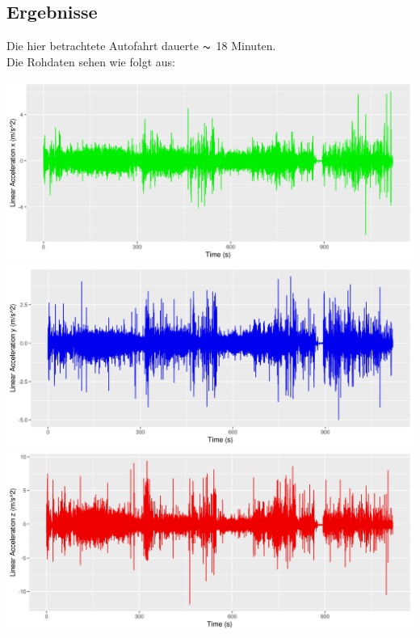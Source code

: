 \documentclass{article}
\begin{document}
\begin{multicols*}{3}
   \section*{Ergebnisse}
   Die hier betrachtete Autofahrt dauerte $\thicksim$ 18 Minuten.\\
   Die Rohdaten sehen wie folgt aus:\\
   \begin{center}
      \includegraphics[width=0.9\linewidth]{../images/Calculations_cell_2_output_0}
      \includegraphics[width=0.9\linewidth]{../images/Calculations_cell_3_output_0}
      \includegraphics[width=0.9\linewidth]{../images/Calculations_cell_4_output_0}
   \end{center}

\end{multicols*}
\end{document}
